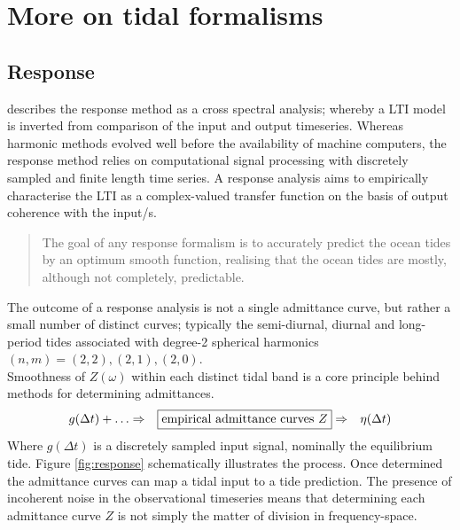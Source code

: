 \chapter{More on tidal formalisms}
\label{appendix:tideFormalisms}
\section{Response}
\citet{Godin:1991vx} describes the response method as a cross spectral analysis; whereby a LTI model is inverted from comparison of the input and output timeseries.   
Whereas harmonic methods evolved well before the availability of machine computers, the response method relies on computational signal processing with discretely sampled and finite length time series.
A response analysis aims to empirically characterise the LTI as a complex-valued transfer function on the basis of output coherence with the input/s. 
\begin{quotation}
The goal of any response formalism is to accurately predict the ocean tides by an optimum smooth function, realising that the ocean tides are mostly, although not completely, predictable.
\end{quotation}
The outcome of a response analysis is not a single admittance curve, but rather a small number of distinct curves; typically the semi-diurnal, diurnal and long-period tides associated with degree-2 spherical harmonics $(n,m)=(2,2),(2,1),(2,0)$.\\
Smoothness of $Z(\omega)$ within each distinct tidal band is a core principle behind methods for determining admittances.  
\begin{align}
    \label{E:response}
    g(\Delta t) + \dots &\Rightarrow & \fbox{empirical admittance curves $Z$} &\Rightarrow & \mbox{$\eta(\Delta t)$}  %
\end{align}
Where $g(\Delta t)$ is a discretely sampled input signal, nominally the equilibrium tide.   Figure \ref{fig:response} schematically illustrates the process.
Once determined the admittance curves can map a tidal input to a tide prediction.
The presence of incoherent noise in the observational timeseries means that determining each admittance curve $Z$ is not simply the matter of division in frequency-space.


